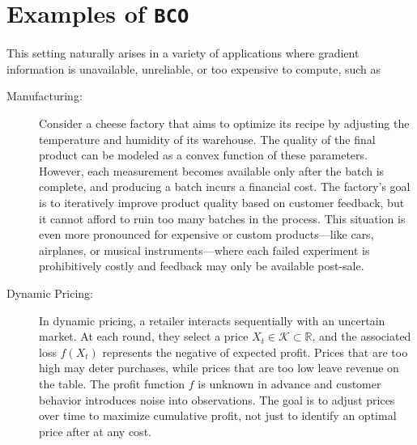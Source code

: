 \documentclass[letter, 12pt]{report}
\newcommand{\R}{\mathbb R}
\newcommand{\cK}{\mathcal K}
\newcommand{\1}{\mathbf{1}}
\newcommand{\bco}{\texttt{BCO}\xspace}
\theoremstyle{plain}
\theoremstyle{definition}
\theoremstyle{remark}
\begin{document}
\section{Examples of \bco}
This setting naturally arises in a variety of applications where gradient information is unavailable, unreliable, or too expensive to compute,
such as
\begin{description}
    \item[\textcolor{dkblue}{Manufacturing:}]
          Consider a cheese factory that aims to optimize its recipe by adjusting the temperature and humidity of its warehouse.
          The quality of the final product can be modeled as a convex function of these parameters.
          However, each measurement becomes available only after the batch is complete, and producing a batch incurs a financial cost.
          The factory’s goal is to iteratively improve product quality based on customer feedback, but it cannot afford to ruin too many batches in the process.
          This situation is even more pronounced for expensive or custom products—like cars, airplanes, or musical instruments—where each failed experiment is prohibitively costly and feedback may only be available post-sale.


    \item[\textcolor{dkblue}{Dynamic Pricing:}]
          In dynamic pricing, a retailer interacts sequentially with an uncertain market.
          At each round, they select a price \(X_t \in \cK \subset \R\), and the associated loss \(f(X_t)\) represents the negative of expected profit.
          Prices that are too high may deter purchases, while prices that are too low leave revenue on the table.
          The profit function \(f\) is unknown in advance and customer behavior introduces noise into observations.
          The goal is to adjust prices over time to maximize cumulative profit, not just to identify an optimal price after at any cost.


\end{description}
\end{document}
